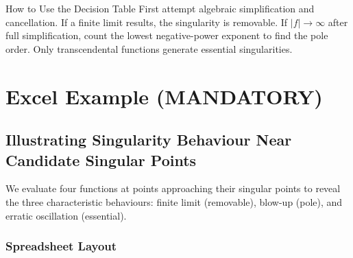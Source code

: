\documentclass[12pt,a4paper]{article}
\begin{document}
\begin{learnbox}{How to Use the Decision Table}
First attempt algebraic simplification and cancellation. If a finite limit results, the singularity
is removable. If $|f|\to\infty$ after full simplification, count the lowest negative-power exponent
to find the pole order. Only transcendental functions generate essential singularities.
\end{learnbox}

\section{Excel Example (MANDATORY)}

\subsection*{Illustrating Singularity Behaviour Near Candidate Singular Points}

We evaluate four functions at points approaching their singular points to reveal the three
characteristic behaviours: finite limit (removable), blow-up (pole), and erratic
oscillation (essential).

\subsubsection*{Spreadsheet Layout}
\end{document}
